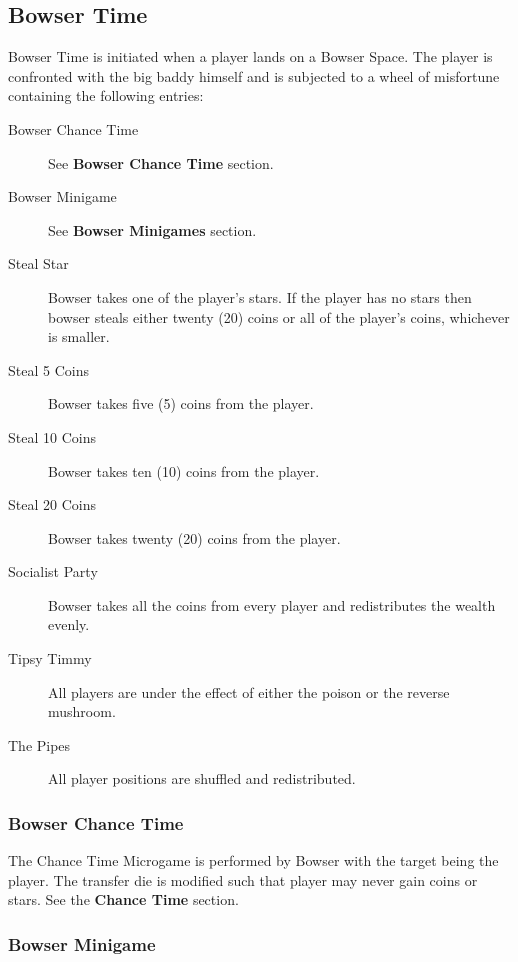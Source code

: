 \documentclass{article}
\begin{document}
\subsection{Bowser Time}

Bowser Time is initiated when a player lands on a Bowser Space.  The player
is confronted with the big baddy himself and is subjected to a wheel of
misfortune containing the following entries:

\begin{description}
\item[Bowser Chance Time] See \textbf{Bowser Chance Time} section.
\item[Bowser Minigame] See \textbf{Bowser Minigames} section.

\item[Steal Star] Bowser takes one of the player's stars.  If the player has no
stars then bowser steals either twenty (20) coins or all of the player's coins,
whichever is smaller.

\item[Steal 5 Coins] Bowser takes five (5) coins from the player.
\item[Steal 10 Coins] Bowser takes ten (10) coins from the player.
\item[Steal 20 Coins] Bowser takes twenty (20) coins from the player.

\item[Socialist Party] Bowser takes all the coins from every player and
redistributes the wealth evenly.

\item[Tipsy Timmy] All players are under the effect of either the
poison or the reverse mushroom.

\item[The Pipes] All player positions are shuffled and redistributed.
\end{description}

\subsubsection{Bowser Chance Time}

The Chance Time Microgame is performed by Bowser with the target being the player.
The transfer die is modified such that player may never gain coins or stars.
See the \textbf{Chance Time} section.

\subsubsection{Bowser Minigame}
\end{document}
